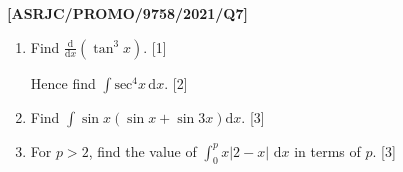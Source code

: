 \item \textbf{{[}ASRJC/PROMO/9758/2021/Q7{]} }
\begin{enumerate}
\item Find $\frac{\text{d}}{\text{d}x}\left(\tan^{3}x\right)$. \hfill{}{[}1{]}

Hence find $\int\text{sec}^{4}x\,\text{d}x$. \hfill{}{[}2{]}
\item Find $\int\sin x\left(\sin x+\sin3x\right)\text{d}x$. \hfill{} {[}3{]}
\item For $p>2$, find the value of $\int_{0}^{p}x\left|2-x\right|\text{ d}x$
in terms of $p$. \hfill{}{[}3{]}
\end{enumerate}